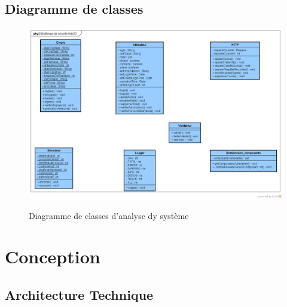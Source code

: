 \subsection{Diagramme de classes}
\begin{figure}[H]
	\centering
	\begin{minipage}{12cm}
		\centering
		{\includegraphics[height=0.35\textheight, width=1\textwidth]{fig/Analyse-Class-Diagram.png}}
	\end{minipage}
	\caption{Diagramme de classes d'analyse dy système}
	\label{fig:7.20}
\end{figure}

\section{Conception}
\subsection{Architecture Technique}

